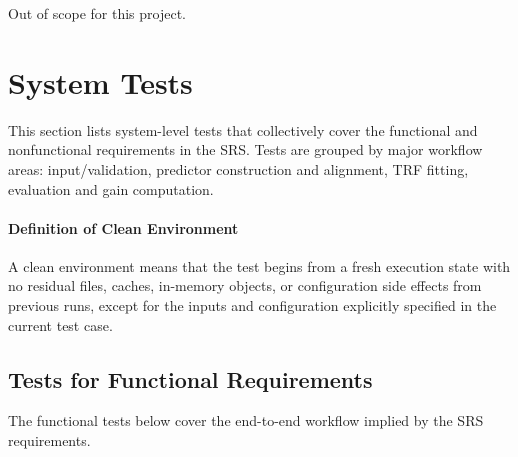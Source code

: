 \documentclass[12pt, titlepage]{article}
\begin{document}



Out of scope for this project.



\section{System Tests}


This section lists system-level tests that collectively cover the functional and nonfunctional requirements in the SRS. 
Tests are grouped by major workflow areas: input/validation, predictor construction and alignment, TRF fitting, evaluation
and gain computation.

\paragraph{Definition of Clean Environment}
A clean environment means that the test begins from a fresh execution state with no residual files, caches, in-memory objects, or configuration side effects from previous runs, except for the inputs and configuration explicitly specified in the current test case.

\subsection{Tests for Functional Requirements}


The functional tests below cover the end-to-end workflow implied by the SRS requirements. 
\end{document}
